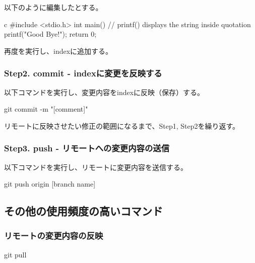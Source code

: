 \documentclass[10pt,a4j,openany,dvipdfmx]{jsarticle}
\begin{document}
以下のように編集したとする。
\begin{numList}{c}
#include <stdio.h>
int main() {
   // printf() displays the string inside quotation
   printf("Good Bye!");
   return 0;
}
\end{numList}

再度を実行し、indexに追加する。


\subsubsection{Step2. commit - indexに変更を反映する} %
\label{ssub:step2_commit_indexに変更を反映する}

以下コマンドを実行し、変更内容をindexに反映（保存）する。
\begin{commandshell}
git commit -m "[comment]"
\end{commandshell}

リモートに反映させたい修正の範囲になるまで、Step1, Step2を繰り返す。

\subsubsection{Step3. push - リモートへの変更内容の送信} %
\label{ssub:step3_push_リモートへの変更内容の送信}

以下コマンドを実行し、リモートに変更内容を送信する。
\begin{commandshell}
git push origin [branch name]
\end{commandshell}



\subsection{その他の使用頻度の高いコマンド} %
\label{sub:その他の使用頻度の高いコマンド}

\subsubsection{リモートの変更内容の反映} %
\label{ssub:リモートの変更内容の反映}

\begin{commandshell}
git pull
\end{commandshell}
\end{document}
